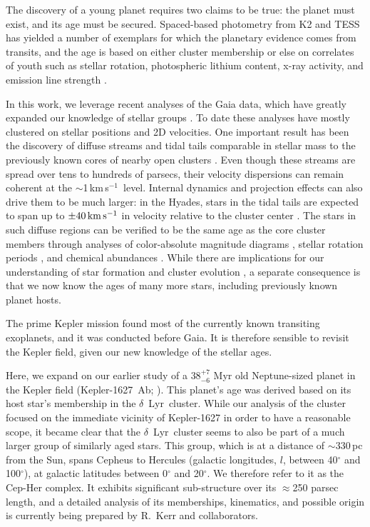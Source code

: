 \documentclass[12pt,twocolumn]{aastex63}
\newcommand{\kms}{\,km\,s$^{-1}$}
\newcommand{\mkms}{{\rm \,km\,s^{-1}}}  %
\begin{document}
The discovery of a young planet requires two claims to be true:
the planet must exist, and its age must be secured.  Spaced-based
photometry from K2 and TESS has yielded a number of exemplars for
which the planetary evidence comes from transits, and the age is based
on either cluster membership
\citep{Mann_et_al_2017,david_four_2019,newton_tess_2019,bouma_cluster_2020,nardiello_pathosII_2020}
or else on correlates of youth such as stellar rotation, photospheric
lithium content, x-ray activity, and emission line strength
\citep{zhou_2021_tois,hedges_toi-2076_2021}.

In this work, we leverage recent analyses of the Gaia data, which have
greatly expanded our knowledge of stellar groups \citep[{e.g.},][]{CantatGaudin2018a,KounkelCovey2019,Kerr2021}.  To date these
analyses have mostly clustered on stellar positions and 2D
velocities.  One important result has been the discovery of
diffuse streams and tidal tails comparable in stellar mass to the
previously known cores of nearby open clusters
\citep{meingast_psceri_2019,Meingast2021,gagne_number_2021}.  Even
though these streams are spread over tens to hundreds of
parsecs, their velocity dispersions can remain coherent at the
$\sim$1\kms\ level.  Internal dynamics and projection effects can also
drive them to be much larger: in the Hyades,
stars in the tidal tails are expected to span up to $\pm 40\mkms$ in velocity
relative to the cluster center \citep{jerabkova_800_2021}.
The stars in such diffuse regions can be verified to be the same age
as the core cluster members through analyses of
color-absolute magnitude diagrams \citep{KounkelCovey2019}, stellar
rotation periods \citep{curtis_tess_2019,bouma_2021_ngc2516}, and
chemical abundances \citep{hawkins_2020}.  While there are 
implications for our understanding of star formation and cluster
evolution \citep{dinnbier_tidal_2020}, a separate consequence is that
we now know the ages of many more stars, including previously known
planet hosts.

The prime Kepler mission \citep{borucki_kepler_2010} found most of the
currently known transiting exoplanets, and it was conducted before
Gaia.  It is therefore sensible to revisit the Kepler field, given our
new knowledge of the stellar ages.

Here, we expand on our earlier study of a $38^{+7}_{-6}$ Myr
old Neptune-sized planet in the Kepler field (Kepler-1627~Ab;
\citealt{bouma_kep1627_2022}).  This planet's age was derived
based on its host star's membership in the $\delta$\ Lyr\ cluster.
While our analysis of the cluster focused on the immediate vicinity of
Kepler-1627 in order to have a reasonable scope,  it became
clear that the $\delta$\ Lyr\ cluster seems to
also be part of a much larger group of similarly aged stars.  This
group, which is at a distance of $\sim$330\,pc from the Sun, 
spans Cepheus to Hercules (galactic longitudes, $l$, between
40$^\circ$ and 100$^\circ$), at galactic latitudes between
0$^\circ$ and 20$^\circ$.  We therefore refer to it as the Cep-Her
complex.  It exhibits significant sub-structure over its $\approx$250
parsec length, and a detailed analysis of its memberships, kinematics,
and possible origin is currently being prepared by R.~Kerr and
collaborators.
\end{document}
